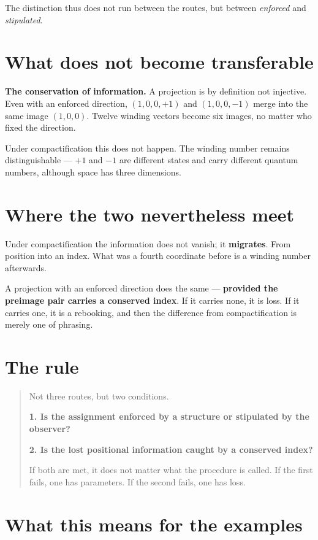 \documentclass[11pt]{report}
\begin{document}
The distinction thus does not run between the routes, but between
\emph{enforced} and \emph{stipulated}.

\section{What does not become transferable}

\textbf{The conservation of information.} A projection is by definition
not injective. Even with an enforced direction, $(1,0,0,+1)$ and
$(1,0,0,-1)$ merge into the same image $(1,0,0)$. Twelve winding
vectors become six images, no matter who fixed the direction.

Under compactification this does not happen. The winding number remains
distinguishable --- $+1$ and $-1$ are different states and carry
different quantum numbers, although space has three dimensions.

\section{Where the two nevertheless meet}

Under compactification the information does not vanish; it
\textbf{migrates}. From position into an index. What was a fourth
coordinate before is a winding number afterwards.

A projection with an enforced direction does the same --- \textbf{provided
the preimage pair carries a conserved index}. If it carries none, it is
loss. If it carries one, it is a rebooking, and then the difference
from compactification is merely one of phrasing.

\section{The rule}

\begin{quote}
Not three routes, but two conditions.

\textbf{1. Is the assignment enforced by a structure or stipulated by
the observer?}

\textbf{2. Is the lost positional information caught by a conserved
index?}

If both are met, it does not matter what the procedure is called. If
the first fails, one has parameters. If the second fails, one has loss.
\end{quote}

\section{What this means for the examples}
\end{document}
